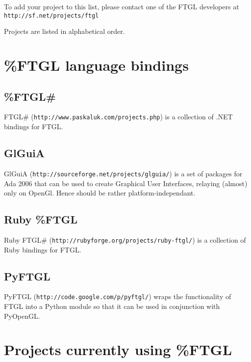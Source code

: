 To add your project to this list, please contact one of the FTGL developers at {\tt http://sf.net/projects/ftgl}

Projects are listed in alphabetical order.\section{\%FTGL language bindings}\label{ftgl-projects_bindings}
\subsection{\%FTGL\#}\label{ftgl-projects_ftglsharp}
FTGL\# ({\tt http://www.paskaluk.com/projects.php}) is a collection of .NET bindings for FTGL.\subsection{GlGuiA}\label{ftgl-projects_glguia}
GlGuiA ({\tt http://sourceforge.net/projects/glguia/}) is a set of packages for Ada 2006 that can be used to create Graphical User Interfaces, relaying (almost) only on OpenGl. Hence should be rather platform-\/independant.\subsection{Ruby \%FTGL}\label{ftgl-projects_ruby-ftgl}
Ruby FTGL\# ({\tt http://rubyforge.org/projects/ruby-\/ftgl/}) is a collection of Ruby bindings for FTGL.\subsection{PyFTGL}\label{ftgl-projects_pyftgl}
PyFTGL ({\tt http://code.google.com/p/pyftgl/}) wraps the functionality of FTGL into a Python module so that it can be used in conjunction with PyOpenGL.\section{Projects currently using \%FTGL}\label{ftgl-projects_current}
